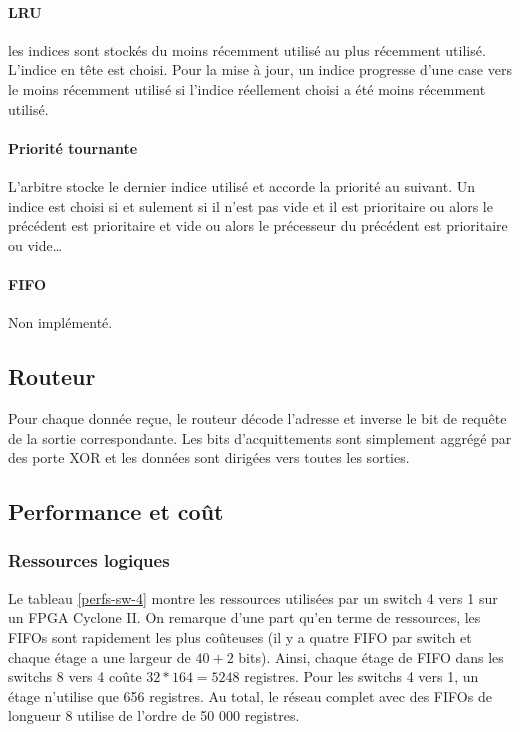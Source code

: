 \documentclass[11pt]{article}
\begin{document}
\paragraph{LRU}
les indices sont stockés du moins récemment utilisé au plus récemment utilisé. L'indice en tête est choisi. Pour la mise à jour, un indice progresse d'une case vers le moins récemment utilisé si l'indice réellement choisi a été moins récemment utilisé.
\paragraph{Priorité tournante}
L'arbitre stocke le dernier indice utilisé et accorde la priorité au suivant. Un indice est choisi si et sulement si il n'est pas vide et il est prioritaire ou alors le précédent est prioritaire et vide ou alors le précesseur du précédent est prioritaire ou vide\ldots
\paragraph{FIFO} Non implémenté.


\subsection{Routeur}

Pour chaque donnée reçue, le routeur décode l'adresse et inverse le bit de requête de la sortie correspondante. Les bits d'acquittements sont simplement aggrégé par des porte XOR et les données sont dirigées vers toutes les sorties.

\subsection{Performance et coût}

\subsubsection{Ressources logiques}
Le tableau \ref{perfs-sw-4} montre les ressources utilisées par un switch 4 vers 1 sur un FPGA Cyclone II. On remarque d'une part qu'en terme de ressources, les FIFOs sont rapidement les plus coûteuses (il y a quatre FIFO par switch et chaque étage a une largeur de $40+2$ bits). Ainsi, chaque étage de FIFO dans les switchs 8 vers 4 coûte $32*164=5248$ registres. Pour les switchs 4 vers 1, un étage n'utilise que 656 registres. Au total, le réseau complet avec des FIFOs de longueur 8 utilise de l'ordre de 50 000 registres.
\end{document}

